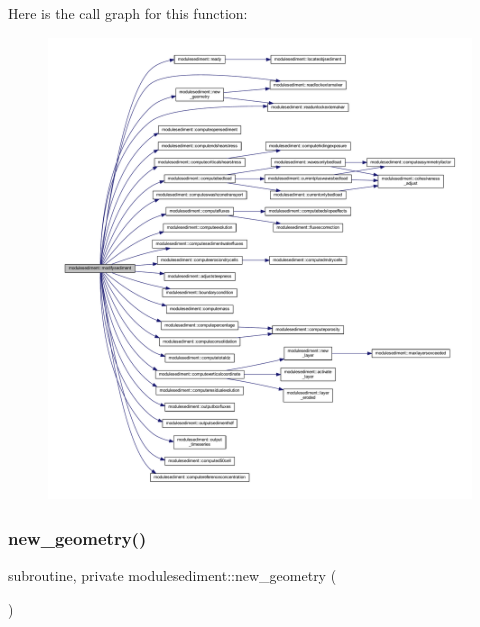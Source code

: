 Here is the call graph for this function\+:\nopagebreak
\begin{figure}[H]
\begin{center}
\leavevmode
\includegraphics[width=350pt]{namespacemodulesediment_a8bd56ac218e3c51dd03eb2967d7e9398_cgraph}
\end{center}
\end{figure}
\mbox{\label{namespacemodulesediment_aa3fda34444f716aac00714d297af27d3}} 
\subsubsection{\texorpdfstring{new\+\_\+geometry()}{new\_geometry()}}
{\footnotesize\ttfamily subroutine, private modulesediment\+::new\+\_\+geometry (\begin{DoxyParamCaption}{ }\end{DoxyParamCaption})\hspace{0.3cm}{\ttfamily [private]}}

